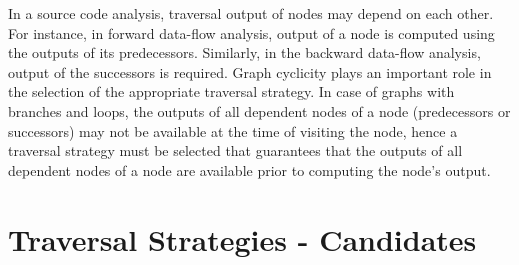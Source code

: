 In a source code analysis, traversal output of nodes may depend on each other.
For instance, in forward data-flow analysis, output of a node is computed using
the outputs of its predecessors. Similarly, in the backward data-flow analysis,
output of the successors is required.
Graph cyclicity plays an important role in the selection of the appropriate
traversal strategy. In case of graphs with branches and loops, the outputs of
all dependent nodes of a node (predecessors or successors) may not be available
at the time of visiting the node, hence a traversal strategy must be selected
that guarantees that the outputs of all dependent nodes of a node are available
prior to computing the node's output. 

% 

% 

% 

\section{Traversal Strategies - Candidates}
\label{sec:candidates}


